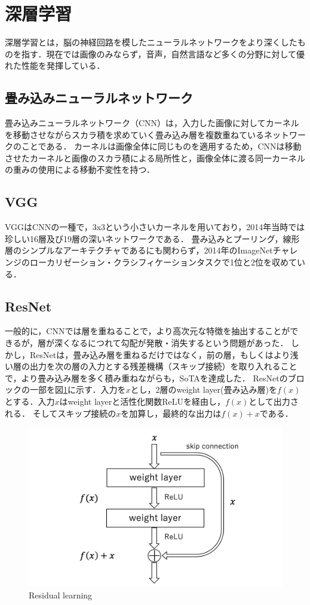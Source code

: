 \documentclass[a4paper, oneside, openany, dvipdfmx]{suribt}%
\newcommand{\fref}[1]{図\ref{#1}}
\begin{document}
\section{深層学習}
深層学習とは，脳の神経回路を模したニューラルネットワークをより深くしたものを指す．現在では画像のみならず，音声，自然言語など多くの分野に対して優れた性能を発揮している．
\subsection{畳み込みニューラルネットワーク}
畳み込みニューラルネットワーク（CNN）は，入力した画像に対してカーネルを移動させながらスカラ積を求めていく畳み込み層を複数重ねているネットワークのことである．
カーネルは画像全体に同じものを適用するため，CNNは移動させたカーネルと画像のスカラ積による局所性と，画像全体に渡る同一カーネルの重みの使用による移動不変性を持つ．
\subsection{VGG}
VGGはCNNの一種で，3x3という小さいカーネルを用いており，2014年当時では珍しい16層及び19層の深いネットワークである\cite{simonyan2015deep}．
畳み込みとプーリング，線形層のシンプルなアーキテクチャであるにも関わらず，2014年のImageNetチャレンジのローカリゼーション・クラシフィケーションタスクで1位と2位を収めている．

\subsection{ResNet}
一般的に，CNNでは層を重ねることで，より高次元な特徴を抽出することができるが，層が深くなるにつれて勾配が発散・消失するという問題があった．
しかし，ResNetは，畳み込み層を重ねるだけではなく，前の層，もしくはより浅い層の出力を次の層の入力とする残差機構（スキップ接続）を取り入れることで，より畳み込み層を多く積み重ねながらも，SoTAを達成した\cite{he2015deep}．
ResNetのブロックの一部を\fref{fig:res_arch}に示す．入力を$x$とし，2層のweight layer(畳み込み層)を$f(x)$とする．入力$x$はweight layerと活性化関数ReLUを経由し，$f(x)$として出力される．
そしてスキップ接続の$x$を加算し，最終的な出力は$f(x)+x$である．
\begin{figure}[H]
  \centering
  \includegraphics[width=0.9\linewidth]{figs/resnet.png}
  \caption{Residual learning\cite{he2015deep}}
  \label{fig:res_arch}
\end{figure}
\end{document}
